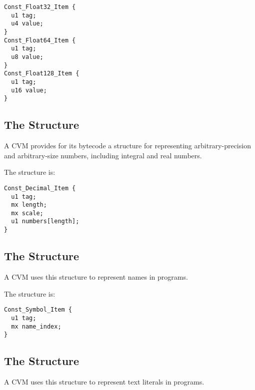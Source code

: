 \begin{minipage}{\linewidth}
\begin{lstlisting}
Const_Float32_Item {
  u1 tag;
  u4 value;
}
Const_Float64_Item {
  u1 tag;
  u8 value;
}
Const_Float128_Item {
  u1 tag;
  u16 value;
}
\end{lstlisting}
\end{minipage}






\subsection{The  Structure}

A CVM provides for its bytecode a structure for representing arbitrary-precision and arbitrary-size numbers, including integral and real numbers. 

The  structure is:

\begin{minipage}{\linewidth}
\begin{lstlisting}
Const_Decimal_Item {
  u1 tag;
  mx length;
  mx scale;
  u1 numbers[length];
}
\end{lstlisting}
\end{minipage}






\subsection{The  Structure}

A CVM uses this structure to represent names in programs. 

The  structure is:

\begin{minipage}{\linewidth}
\begin{lstlisting}
Const_Symbol_Item {
  u1 tag;
  mx name_index;
}
\end{lstlisting}
\end{minipage}






\subsection{The  Structure}

A CVM uses this structure to represent text literals in programs. 

